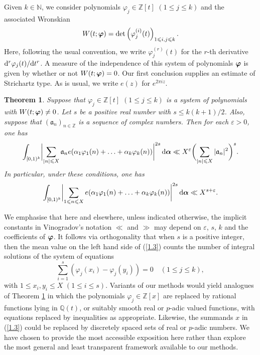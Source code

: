 \documentclass[12pt,reqno]{amsart}
\newtheorem{theorem}{Theorem}[section]
\theoremstyle{definition}
\theoremstyle{remark}
\numberwithin{equation}{section}
\def\dbN{{\mathbb N}} \def\dbO{{\mathbb O}} \def\dbP{{\mathbb P}}
\def\dbZ{{\mathbb Z}}\def\dbQ{{\mathbb Q}}
\def\gra{{\mathfrak a}}\def\grA{{\mathfrak A}}\def\bfgra{{\boldsymbol \gra}}
\def\alp{{\alpha}} \def\bfalp{{\boldsymbol \alpha}}
\def\eps{\varepsilon}
\def\le{\leqslant} \def\ge{\geqslant} \def\pleq{\preccurlyeq} \def\ple{\prec}
\def\d{{\,{\rm d}}}
\begin{document}
Given $k\in \dbN$, we consider polynomials $\varphi_j\in \dbZ[t]$ $(1\le j\le k)$ and the 
associated Wronskian
\begin{equation}\label{1.1}
W(t;\bfvarphi)=\det \left( \varphi_j^{(i)}(t)\right)_{1\le i,j\le k}.
\end{equation}
Here, following the usual convention, we write $\varphi_j^{(r)}(t)$ for the $r$-th derivative 
${\rm d}^r\varphi_j(t)/{\rm d}t^r$. A measure of the independence of this system of 
polynomials ${\boldsymbol \varphi}$ is given by whether or not $W(t;{\boldsymbol \varphi})=0$. Our first conclusion 
supplies an estimate of Strichartz type. As is usual, we write $e(z)$ for $e^{2\pi iz}$.

\begin{theorem}\label{theorem1.1} Suppose that $\varphi_j\in \dbZ[t]$ $(1\le j\le k)$ is a 
system of polynomials with $W(t;{\boldsymbol \varphi})\ne 0$. Let $s$ be a positive real number with 
$s\le k(k+1)/2$. Also, suppose that $(\gra_n)_{n\in \dbZ}$ is a sequence of complex 
numbers. Then for each $\eps>0$, one has
\begin{equation}\label{1.2}
\int_{[0,1)^k}\biggl| \sum_{|n|\le X}\gra_ne(\alp_1\varphi_1(n)+\ldots 
+\alp_k\varphi_k(n))\biggl|^{2s}\d\bfalp \ll X^\eps \biggl( \sum_{|n|\le X}
|\gra_n|^2\biggr)^s.
\end{equation}
In particular, under these conditions, one has
\begin{equation}\label{1.3}
\int_{[0,1)^k}\biggl| \sum_{1\le n\le X}e(\alp_1\varphi_1(n)+\ldots +\alp_k\varphi_k(n))
\biggl|^{2s}\d\bfalp \ll X^{s+\eps}.
\end{equation}
\end{theorem}

We emphasise that here and elsewhere, unless indicated otherwise, the implicit constants in 
Vinogradov's notation $\ll$ and $\gg$ may depend on $\eps$, $s$, $k$ and the coefficients 
of ${\boldsymbol \varphi}$. It follows via orthogonality that when $s$ is a positive integer, then the mean 
value on the left hand side of (\ref{1.3}) counts the number of integral solutions of the 
system of equations
\begin{equation}\label{1.4}
\sum_{i=1}^s\left( \varphi_j(x_i)-\varphi_j(y_i)\right)=0\quad (1\le j\le k),
\end{equation}
with $1\le x_i,y_i\le X$ $(1\le i\le s)$. Variants of our methods would yield analogues of 
Theorem \ref{theorem1.1} in which the polynomials $\varphi_j\in \dbZ[x]$ are replaced 
by rational functions lying in $\dbQ(t)$, or suitably smooth real or $p$-adic valued 
functions, with equations replaced by inequalities as appropriate. Likewise, the summands 
$x$ in (\ref{1.3}) could be replaced by discretely spaced sets of real or $p$-adic numbers. 
We have chosen to provide the most accessible exposition here rather than explore the most 
general and least transparent framework available to our methods.\par
\end{document}
